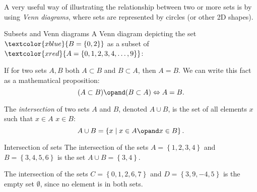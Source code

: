 A very useful way of illustrating the relationship between two or more sets is by using \emph{Venn diagrams}, where sets are represented by circles (or other 2D shapes).

\begin{example}{Subsets and Venn diagrams}{}
	A Venn diagram depicting the set $\textcolor{xblue}{B=\left\{ 0,2 \right\}}$ as a subset of $\textcolor{xred}{A=\left\{ 0,1,2,3,4,\dots,9 \right\}}$:
	\begin{figure}[H]
		\centering
	\end{figure}
\end{example}

If for two sets $A,B$ both $A\subset B$ and $B\subset A$, then $A=B$. We can write this fact as a mathematical proposition:
\begin{equation}
	(A\subset B) \opand (B\subset A) \Leftrightarrow A=B.
	\label{eq:subset_equal}
\end{equation}

The \emph{intersection} of two sets $A$ and $B$, denoted $A\cup B$, is the set of all elements $x$ such that $x\in A$ \AND{} $x\in B$:
\begin{equation}
	A\cup B = \left\{ x \mid x\in A \opand x\in B \right\}.
	\label{eq:intersection}
\end{equation}

\begin{example}{Intersection of sets}{}
	The intersection of the sets $A=\left\{ 1,2,3,4 \right\}$ and $B=\left\{ 3,4,5,6 \right\}$ is the set $A\cup B=\left\{ 3,4 \right\}$.

	The intersection of the sets $C=\left\{ 0,1,2,6,7 \right\}$ and $D=\left\{ 3,9,-4,5 \right\}$ is the empty set $\emptyset$, since no element is in both sets.
\end{example}
  
